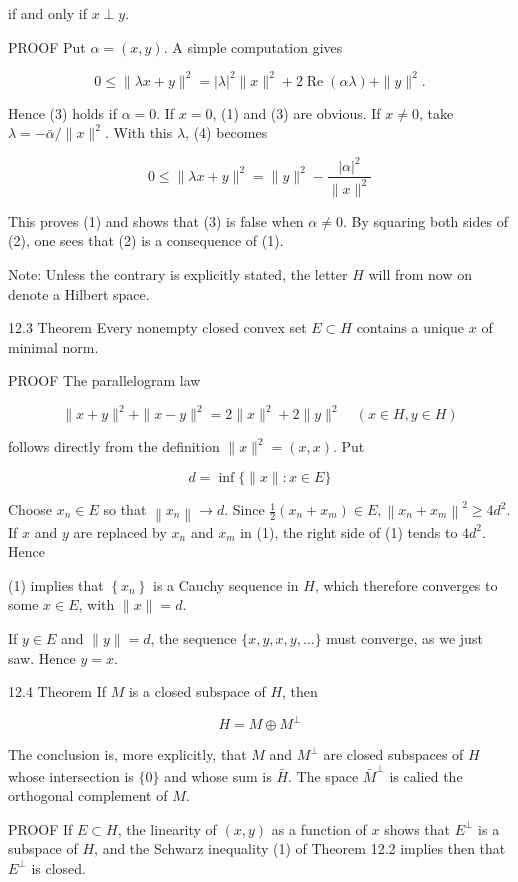 \documentclass[10pt]{article}
\begin{document}
if and only if $x \perp y$.

PROOF Put $\alpha=(x, y)$. A simple computation gives

$$
0 \leq\|\lambda x+y\|^{2}=|\lambda|^{2}\|x\|^{2}+2 \operatorname{Re}(\alpha \lambda)+\|y\|^{2} .
$$

Hence (3) holds if $\alpha=0$. If $x=0$, (1) and (3) are obvious. If $x \neq 0$, take $\lambda=-\bar{\alpha} /\|x\|^{2}$. With this $\lambda$, (4) becomes

$$
0 \leq\|\lambda x+y\|^{2}=\|y\|^{2}-\frac{|\alpha|^{2}}{\|x\|^{2}}
$$

This proves (1) and shows that (3) is false when $\alpha \neq 0$. By squaring both sides of (2), one sees that (2) is a consequence of (1).

Note: Unless the contrary is explicitly stated, the letter $H$ will from now on denote a Hilbert space.

12.3 Theorem Every nonempty closed convex set $E \subset H$ contains a unique $x$ of minimal norm.

PROOF The parallelogram law

$$
\|x+y\|^{2}+\|x-y\|^{2}=2\|x\|^{2}+2\|y\|^{2} \quad(x \in H, y \in H)
$$

follows directly from the definition $\|x\|^{2}=(x, x)$. Put

$$
d=\inf \{\|x\|: x \in E\}
$$

Choose $x_{n} \in E$ so that $\left\|x_{n}\right\| \rightarrow d$. Since $\frac{1}{2}\left(x_{n}+x_{m}\right) \in E,\left\|x_{n}+x_{m}\right\|^{2} \geq 4 d^{2}$. If $x$ and $y$ are replaced by $x_{n}$ and $x_{m}$ in (1), the right side of (1) tends to $4 d^{2}$. Hence

(1) implies that $\left\{x_{n}\right\}$ is a Cauchy sequence in $H$, which therefore converges to some $x \in E$, with $\|x\|=d$.

If $y \in E$ and $\|y\|=d$, the sequence $\{x, y, x, y, \ldots\}$ must converge, as we just saw. Hence $y=x$.

12.4 Theorem If $M$ is a closed subspace of $H$, then

$$
H=M \oplus M^{\perp}
$$

The conclusion is, more explicitly, that $M$ and $M^{\perp}$ are closed subspaces of $H$ whose intersection is $\{0\}$ and whose sum is $\bar{H}$. The space $\bar{M}^{\perp}$ is calied the orthogonal complement of $M$.

PROOF If $E \subset H$, the linearity of $(x, y)$ as a function of $x$ shows that $E^{\perp}$ is a subspace of $H$, and the Schwarz inequality (1) of Theorem 12.2 implies then that $E^{\perp}$ is closed.
\end{document}
